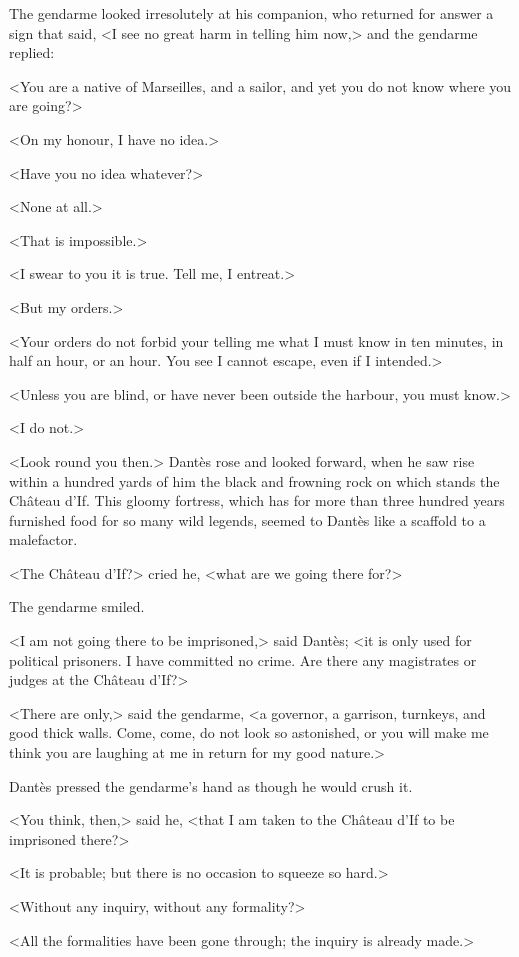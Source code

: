  The gendarme looked irresolutely at his companion, who returned for answer a sign that said, <I see no great harm in telling him now,> and the gendarme replied: 

 <You are a native of Marseilles, and a sailor, and yet you do not know where you are going?> 

 <On my honour, I have no idea.> 

 <Have you no idea whatever?> 

 <None at all.> 

 <That is impossible.> 

 <I swear to you it is true. Tell me, I entreat.> 

 <But my orders.> 

 <Your orders do not forbid your telling me what I must know in ten minutes, in half an hour, or an hour. You see I cannot escape, even if I intended.> 

 <Unless you are blind, or have never been outside the harbour, you must know.> 

 <I do not.> 

 <Look round you then.> Dantès rose and looked forward, when he saw rise within a hundred yards of him the black and frowning rock on which stands the Château d'If. This gloomy fortress, which has for more than three hundred years furnished food for so many wild legends, seemed to Dantès like a scaffold to a malefactor. 

 <The Château d'If?> cried he, <what are we going there for?> 

 The gendarme smiled. 

 <I am not going there to be imprisoned,> said Dantès; <it is only used for political prisoners. I have committed no crime. Are there any magistrates or judges at the Château d'If?> 

 <There are only,> said the gendarme, <a governor, a garrison, turnkeys, and good thick walls. Come, come, do not look so astonished, or you will make me think you are laughing at me in return for my good nature.> 

 Dantès pressed the gendarme's hand as though he would crush it. 

 <You think, then,> said he, <that I am taken to the Château d'If to be imprisoned there?> 

 <It is probable; but there is no occasion to squeeze so hard.> 

 <Without any inquiry, without any formality?> 

 <All the formalities have been gone through; the inquiry is already made.> 

